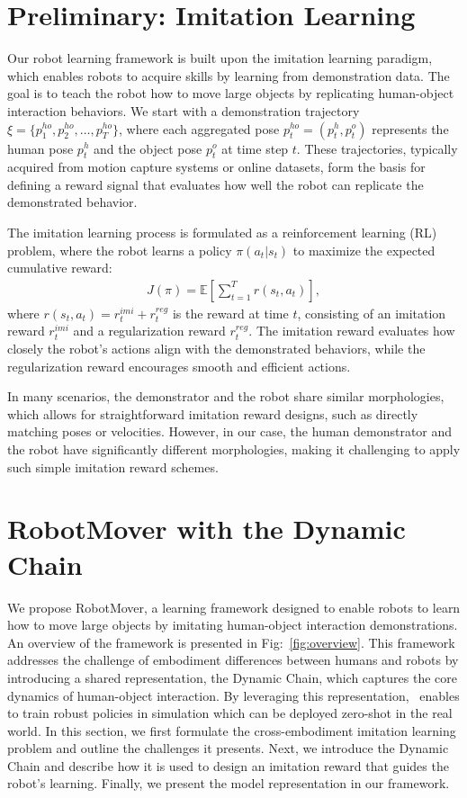 
\section{Preliminary: Imitation Learning}
\label{sec:preliminary}
Our robot learning framework is built upon the imitation learning paradigm, which enables robots to acquire skills by learning from demonstration data. The goal is to teach the robot how to move large objects by replicating human-object interaction behaviors. We start with a demonstration trajectory $\xi = \{p^{ho}_1, p^{ho}_2, \dots, p^{ho}_T \}$, where each aggregated pose $p^{ho}_t = (p^h_t, p^o_t)$ represents the human pose $p^h_t$ and the object pose $p^o_t$ at time step $t$. These trajectories, typically acquired from motion capture systems or online datasets, form the basis for defining a reward signal that evaluates how well the robot can replicate the demonstrated behavior.

The imitation learning process is formulated as a reinforcement learning (RL) problem, where the robot learns a policy $\pi(a_t | s_t)$ to maximize the expected cumulative reward:
\begin{align}
J(\pi) = \mathbb{E}\left[\sum_{t=1}^T r(s_t, a_t)\right],
\end{align}
where $r(s_t, a_t) = r^{imi}_t + r^{reg}_t$ is the reward at time $t$, consisting of an imitation reward $r^{imi}_t$ and a regularization reward $r^{reg}_t$. The imitation reward evaluates how closely the robot's actions align with the demonstrated behaviors, while the regularization reward encourages smooth and efficient actions.

In many scenarios, the demonstrator and the robot share similar morphologies, which allows for straightforward imitation reward designs, such as directly matching poses or velocities. However, in our case, the human demonstrator and the robot have significantly different morphologies, making it challenging to apply such simple imitation reward schemes.


\section{RobotMover with the Dynamic Chain}
\label{sec:method}

We propose RobotMover, a learning framework designed to enable robots to learn how to move large objects by imitating human-object interaction demonstrations. An overview of the framework is presented in Fig:~\ref{fig:overview}.
This framework addresses the challenge of embodiment differences between humans and robots by introducing a shared representation, the Dynamic Chain, which captures the core dynamics of human-object interaction. By leveraging this representation, \method~enables to train robust policies in simulation which can be deployed zero-shot in the real world. In this section, we first formulate the cross-embodiment imitation learning problem and outline the challenges it presents. Next, we introduce the Dynamic Chain and describe how it is used to design an imitation reward that guides the robot's learning. Finally, we present the model representation in our framework.





